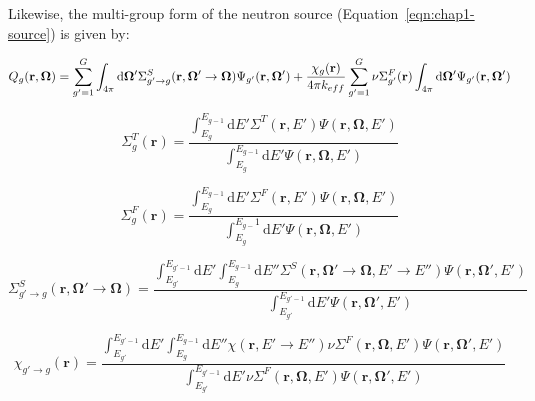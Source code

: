 Likewise, the multi-group form of the neutron source (Equation~\ref{eqn:chap1-source}) is given by:

\begin{dmath}
\label{eqn:chap2-source-mg}
Q_g(\mathbf{r},\mathbf{\Omega}) = \displaystyle\sum\limits_{g'=1}^G \int_{4\pi} \mathrm{d}\mathbf{\Omega'}\Sigma_{g'\rightarrow g}^S(\mathbf{r},{\mathbf{\Omega'}\rightarrow\mathbf{\Omega}}) \Psi_{g'}(\mathbf{r},\mathbf{\Omega'}) + \\ \frac{\chi_{g}(\mathbf{r})}{4\pi k_{eff}} \displaystyle\sum\limits_{g'=1}^G \nu\Sigma_{g'}^F(\mathbf{r}) \int_{4\pi} \mathrm{d}\mathbf{\Omega'} \Psi_{g'}(\mathbf{r},\mathbf{\Omega'})
\end{dmath}

\begin{equation}
\label{eqn:moc-theory-condensed-total-xs}
\Sigma_{g}^T(\mathbf{r}) = \frac{\int_{E_{g}}^{E_{g-1}}\mathrm{d}E'\Sigma^T(\mathbf{r},E')\Psi(\mathbf{r},\mathbf{\Omega},E')}{\int_{E_{g}}^{E_{g-1}}\mathrm{d}E'\Psi(\mathbf{r},\mathbf{\Omega},E')}
\end{equation}

\begin{equation}
\label{eqn:moc-theory-condensed-fission-xs}
\Sigma_{g}^F(\mathbf{r}) = \frac{\int_{E_{g}}^{E_{g-1}}\mathrm{d}E'\Sigma^F(\mathbf{r},E')\Psi(\mathbf{r},\mathbf{\Omega},E')}{\int_{E_{g}}^{E_{g-}1}\mathrm{d}E'\Psi(\mathbf{r},\mathbf{\Omega},E')}
\end{equation}

\begin{equation}
\label{eqn:moc-theory-condensed-scatter-xs}
\Sigma_{g'\rightarrow g}^S(\mathbf{r},\mathbf{\Omega'}\rightarrow \mathbf{\Omega}) = \frac{\int_{E_{g'}}^{E_{g'-1}}\mathrm{d}E'\int_{E_{g}}^{E_{g-1}}\mathrm{d}E''\Sigma^S(\mathbf{r},\mathbf{\Omega'}\rightarrow \mathbf{\Omega},E'\rightarrow E'')\Psi(\mathbf{r},\mathbf{\Omega'},E')}{\int_{E_{g'}}^{E_{g'-1}}\mathrm{d}E'\Psi(\mathbf{r},\mathbf{\Omega'},E')}
\end{equation}

\begin{equation}
\label{eqn:moc-theory-condensed-chi}
\chi_{g'\rightarrow g}(\mathbf{r}) = \frac{\int_{E_{g'}}^{E_{g'-1}}\mathrm{d}E'\int_{E_{g}}^{E_{g-1}}\mathrm{d}E''\chi(\mathbf{r},E'\rightarrow E'')\nu\Sigma^F(\mathbf{r},\mathbf{\Omega},E')\Psi(\mathbf{r},\mathbf{\Omega'},E')}{\int_{E_{g'}}^{E_{g'-1}}\mathrm{d}E'\nu\Sigma^F(\mathbf{r},\mathbf{\Omega},E')\Psi(\mathbf{r},\mathbf{\Omega'},E')}
\end{equation}

